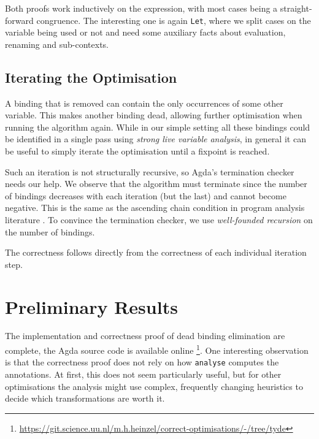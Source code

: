 \documentclass[sigplan,nonacm,screen,review,timestamp]{acmart}
\newcommand{\I}[1]{\texttt{#1}\xspace}
\begin{document}
Both proofs work inductively on the expression, with most cases being a straight-forward congruence.
The interesting one is again \I{Let}, where we split cases on the variable being used or not
and need some auxiliary facts about evaluation, renaming and sub-contexts.

\subsection{Iterating the Optimisation}


A binding that is removed can contain the only occurrences of some other variable.
This makes another binding dead, allowing further optimisation when running the algorithm again.
While in our simple setting all these bindings could be identified in a single pass
using \emph{strong live variable analysis},
in general it can be useful to simply iterate the optimisation until a fixpoint is reached.

Such an iteration is not structurally recursive, so Agda's termination checker needs our help.
We observe that the algorithm must terminate
since the number of bindings decreases with each iteration (but the last) and cannot become negative.
This is the same as the ascending chain condition in program analysis literature
\cite{nielsen1999analysis}.
To convince the termination checker, we use \emph{well-founded recursion} \cite{bove2016recursion}
on the number of bindings.

The correctness follows directly from the correctness of each individual iteration step.

\section{Preliminary Results}

The implementation and correctness proof of dead binding elimination are complete,
the Agda source code is available online
\footnote{\url{https://git.science.uu.nl/m.h.heinzel/correct-optimisations/-/tree/tyde}}.
One interesting observation is that the correctness proof does not rely on how
\I{analyse} computes the annotations.
At first, this does not seem particularly useful,
but for other optimisations the analysis might use complex, frequently changing heuristics to decide
which transformations are worth it.
\end{document}
